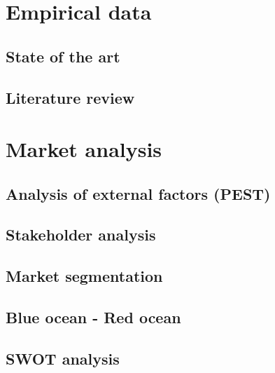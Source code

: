\documentclass[12p]{article}
\begin{document}

\newpage
\section{Empirical data}


\subsection{State of the art}


\subsection{Literature review}


\newpage
\section{Market analysis}

\subsection{Analysis of external factors (PEST)}

\subsection{Stakeholder analysis}

\subsection{Market segmentation}

\subsection{Blue ocean - Red ocean}

\subsection{SWOT analysis}
\end{document}
